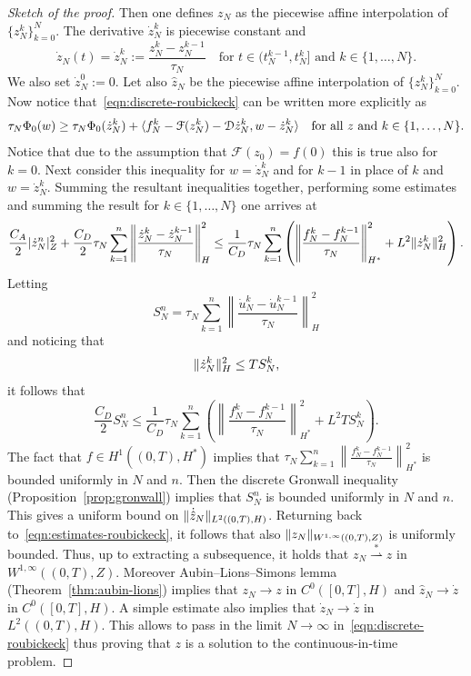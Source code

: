 \documentclass[a4paper,10pt,oneside]{amsbook}
\numberwithin{section}{chapter}
\numberwithin{equation}{chapter}
\theoremstyle{definition}
\DeclarePairedDelimiter{\norm}{\lVert}{\rVert}
\DeclarePairedDelimiter{\dual}{\langle}{\rangle}
\begin{document}
\begin{proof}[Sketch of the proof]
Then one defines $z_N$ as the piecewise affine interpolation of $\{z_N^k\}_{k=0}^N$. The derivative $\dot z_N^k$ is piecewise constant and
\[
\dot z_N(t)=\dot z_N^k:=\frac{z_N^k-z_N^{k-1}}{\tau_N}\quad\text{for $t\in(t_N^{k-1},t_N^k]$ and $k\in\{1,\dots,N\}$}.
\]
We also set $\dot z_N^0:=0$. Let also $\hat z_N$ be the piecewise affine interpolation of $\{z_N^k\}_{k=0}^N$. Now notice that~\eqref{eqn:discrete-roubickeck} can be written more explicitly as
\[
\tau_N\Phi_0(w)\ge\tau_N\Phi_0(\dot z_N^k)+\dual{f_N^k-\mathcal{F}(z_N^k)-\mathcal{D}\dot z_N^k,w-\dot z_N^k}\quad\text{for all $z$ and $k\in\{1,\dots,N\}$}.
\]
Notice that due to the assumption that $\mathcal{F}(z_0)=f(0)$ this is true also for $k=0$. Next consider this inequality for $w=\dot z_N^k$ and for $k-1$ in place of $k$ and $w=\dot z_N^k$. Summing the resultant inequalities together, performing some estimates and summing the result for $k\in\{1,\dots,N\}$ one arrives at
\begin{equation}
\label{eqn:estimates-roubickeck}
\frac{C_A}{2}|\dot z_N^n|_Z^2+\frac{C_D}{2}\tau_N\sum_{k=1}^n\left\lVert\frac{\dot z_N^k-\dot z_N^{k-1}}{\tau_N}\right\rVert_H^2\le\frac{1}{C_D}\tau_N\sum_{k=1}^n\left(\left\lVert\frac{f_N^k-f_N^{k-1}}{\tau_N}\right\rVert_{H^*}^2+L^2\norm{\dot z_N^k}_H^2\right).
\end{equation}
Letting
\[
S_N^n=\tau_N\sum_{k=1}^n\left\lVert\frac{\dot u_N^k-\dot u_N^{k-1}}{\tau_N}\right\rVert_H^2
\]
and noticing that
\[
\norm{\dot z_N^k}_H^2\le TS_N^k,
\]
it follows that
\[
\frac{C_D}{2}S_N^n\le\frac{1}{C_D}\tau_N\sum_{k=1}^n\left(\left\lVert\frac{f_N^k-f_N^{k-1}}{\tau_N}\right\rVert_{H^*}^2+L^2TS_N^k\right).
\]
The fact that $f\in H^1((0,T),H^*)$ implies that $\tau_N\sum_{k=1}^n\left\lVert\frac{f_N^k-f_N^{k-1}}{\tau_N}\right\rVert_{H^*}^2$ is bounded uniformly in $N$ and $n$. Then the discrete Gronwall inequality (Proposition~\ref{prop:gronwall}) implies that $S_N^n$ is bounded uniformly in $N$ and $n$. This gives a uniform bound on $\norm{\dot{\hat z}_N}_{L^2((0,T),H)}$. Returning back to~\eqref{eqn:estimates-roubickeck}, it follows that also $\norm{z_N}_{W^{1,\infty}((0,T),Z)}$ is uniformly bounded. Thus, up to extracting a subsequence, it holds that $z_N\overset{*}{\rightharpoonup}z$ in $W^{1,\infty}((0,T),Z)$. Moreover Aubin--Lions--Simons lemma (Theorem~\ref{thm:aubin-lions}) implies that $z_N\to z$ in $C^0([0,T],H)$ and $\hat{z}_N\to\dot z$ in $C^0([0,T],H)$. A simple estimate also implies that $\dot z_N\to\dot z$ in $L^2((0,T),H)$. This allows to pass in the limit $N\to\infty$ in~\eqref{eqn:discrete-roubickeck} thus proving that $z$ is a solution to the continuous-in-time problem.
\end{proof}
\end{document}
